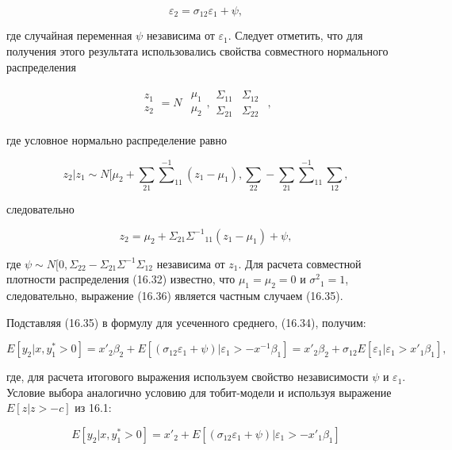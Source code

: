 \begin{equation}
\varepsilon_2=\sigma_{12}\varepsilon_1+\psi,
\end{equation} 

где случайная переменная $\psi$ независима от $\varepsilon_1$. Следует отметить, что для получения этого результата использовались свойства совместного нормального распределения

\[
\begin{matrix}
z_1\\z_2
\end{matrix}
=
N
\begin{matrix}
\begin{matrix}
{\mu}_1\\{\mu}_2
\end{matrix},
\begin{matrix}
\Sigma_{11}&\Sigma_{12} \\ \Sigma_{21}&\Sigma_{22}
\end{matrix}
\end{matrix},
\]

где условное нормально распределение равно

\[
z_2|z_1{\sim}N[\mu_2+\sum_{21}{\sum^{-1}}_{11}(z_{1}-\mu_1),\sum_{22}-\sum_{21}{\sum^{-1}}_{11}\sum_{12},
\]

следовательно

\begin{equation}
z_2=\mu_2+\Sigma_{21}{\Sigma^{-1}}_{11}(z_1-\mu_1)+\psi,
\end{equation}

где $\psi{\sim}N[0,\Sigma_{22}-\Sigma_{21}{\Sigma^{-1}}\Sigma_{12}$ независима от $z_1$. Для расчета совместной плотности распределения (16.32) известно, что $\mu_1=\mu_2=0$ и ${\sigma^{2}}_1=1$, следовательно, выражение (16.36) является частным случаем (16.35).

Подставляя (16.35) в формулу для усеченного среднего, (16.34), получим:

\[
E[y_2|x,y^{*}_1>0]=x'_2\beta_2+E[(\sigma_{12}\varepsilon_1+\psi)|\varepsilon_1>-x^{-1}\beta_1]=x'_{2}\beta_2+\sigma_{12}E[\varepsilon_1|\varepsilon_1>x'_1\beta_1],
\]
 
где, для расчета итогового выражения используем свойство независимости $\psi$ и $\varepsilon_1$. Условие выбора аналогично условию для тобит-модели и используя выражение $E[z|z>{-c}]$ из 16.1:

\[
E[y_2|x,y^{*}_1>0]={x'}_2+E[(\sigma_{12}\varepsilon_{1}+\psi)|\varepsilon_1>-{x'}_1\beta_1]
\]

